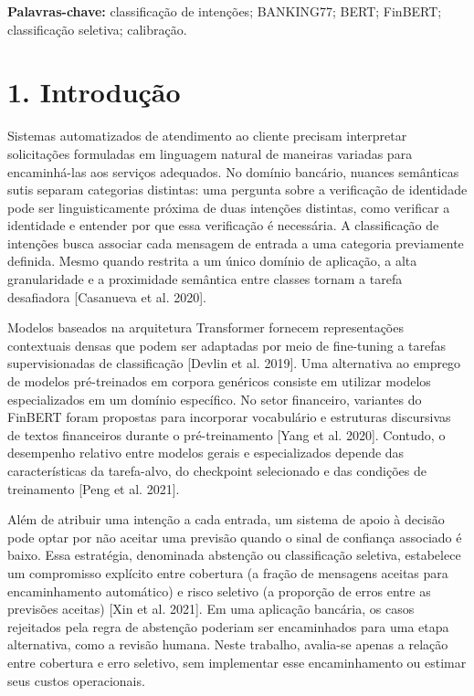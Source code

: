 \documentclass[12pt,a4paper]{article}
\begin{document}
\textbf{Palavras-chave:} classificação de intenções; BANKING77; BERT; FinBERT; classificação seletiva; calibração.

\section*{\textbf{1. Introdução}}

Sistemas automatizados de atendimento ao cliente precisam interpretar solicitações formuladas em linguagem natural de maneiras variadas para encaminhá-las aos serviços adequados. No domínio bancário, nuances semânticas sutis separam categorias distintas: uma pergunta sobre a verificação de identidade pode ser linguisticamente próxima de duas intenções distintas, como verificar a identidade e entender por que essa verificação é necessária. A classificação de intenções busca associar cada mensagem de entrada a uma categoria previamente definida. Mesmo quando restrita a um único domínio de aplicação, a alta granularidade e a proximidade semântica entre classes tornam a tarefa desafiadora [Casanueva et al. 2020].

Modelos baseados na arquitetura Transformer fornecem representações contextuais densas que podem ser adaptadas por meio de fine-tuning a tarefas supervisionadas de classificação [Devlin et al. 2019]. Uma alternativa ao emprego de modelos pré-treinados em corpora genéricos consiste em utilizar modelos especializados em um domínio específico. No setor financeiro, variantes do FinBERT foram propostas para incorporar vocabulário e estruturas discursivas de textos financeiros durante o pré-treinamento [Yang et al. 2020]. Contudo, o desempenho relativo entre modelos gerais e especializados depende das características da tarefa-alvo, do checkpoint selecionado e das condições de treinamento [Peng et al. 2021].

Além de atribuir uma intenção a cada entrada, um sistema de apoio à decisão pode optar por não aceitar uma previsão quando o sinal de confiança associado é baixo. Essa estratégia, denominada abstenção ou classificação seletiva, estabelece um compromisso explícito entre cobertura (a fração de mensagens aceitas para encaminhamento automático) e risco seletivo (a proporção de erros entre as previsões aceitas) [Xin et al. 2021]. Em uma aplicação bancária, os casos rejeitados pela regra de abstenção poderiam ser encaminhados para uma etapa alternativa, como a revisão humana. Neste trabalho, avalia-se apenas a relação entre cobertura e erro seletivo, sem implementar esse encaminhamento ou estimar seus custos operacionais.
\end{document}
